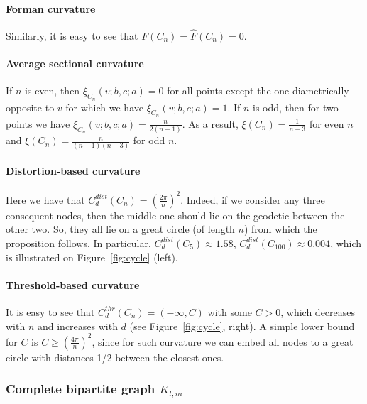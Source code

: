 \documentclass{article} %
\newtheorem{proposition}[theorem]{Proposition}
\begin{document}
\paragraph{Forman curvature} 

Similarly, it is easy to see that $F(C_n) = \hat F(C_n) = 0$.

\paragraph{Average sectional curvature} If $n$ is even, then $\xi_{C_n}(v;b,c;a) = 0$ for all points except the one diametrically opposite to $v$ for which we have $\xi_{C_n}(v;b,c;a) = 1$. If $n$ is odd, then for two points we have $\xi_{C_n}(v;b,c;a) = \frac{n}{2(n-1)}$. As a result, $\xi(C_n) = \frac{1}{n-3}$ for even $n$ and $\xi(C_n) = \frac{n}{(n-1)(n-3)}$ for odd $n$.

\paragraph{Distortion-based curvature} 

Here we have that
$	C_d^{dist}(C_n) = \left(\frac{2\pi}{n}\right)^2.$
Indeed, if we consider any three consequent nodes, then the middle one should lie on the geodetic between the other two. So, they all lie on a great circle (of length $n$) from which the proposition follows.
In particular, $C_d^{dist}(C_5) \approx 1.58$, $C_d^{dist}(C_{100}) \approx 0.004$, which is illustrated on Figure~\ref{fig:cycle} (left).

\paragraph{Threshold-based curvature} 
It is easy to see that $C_d^{thr}(C_n) = (-\infty, C)$ with some $C>0$, which decreases with $n$ and increases with $d$ (see Figure~\ref{fig:cycle}, right). A simple lower bound for $C$ is $C \ge \left(\frac{4\pi}{n}\right)^2$, since for such curvature we can embed all nodes to a great circle with distances 1/2 between the closest ones. 


\subsubsection{Complete bipartite graph $K_{l,m}$}
\end{document}
